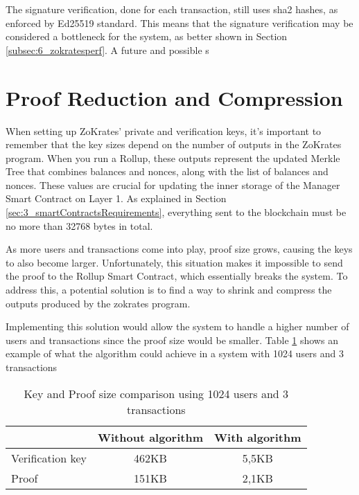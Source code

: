 The signature verification, done for each transaction, still uses sha2 hashes, as enforced by Ed25519 standard. This means that the signature verification may be considered a bottleneck for the system, as better shown in Section \ref{subsec:6_zokratesperf}. A future and possible s

\section{Proof Reduction and Compression \label{sec:5_redandcompr}}

When setting up ZoKrates' private and verification keys, it's important to remember that the key sizes depend on the number of outputs in the ZoKrates program. When you run a Rollup, these outputs represent the updated Merkle Tree that combines balances and nonces, along with the list of balances and nonces. These values are crucial for updating the inner storage of the Manager Smart Contract on Layer 1. As explained in Section \ref{sec:3_smartContractsRequirements}, everything sent to the blockchain must be no more than 32768 bytes in total.

As more users and transactions come into play, proof size grows, causing the keys to also become larger. Unfortunately, this situation makes it impossible to send the proof to the Rollup Smart Contract, which essentially breaks the system. To address this, a potential solution is to find a way to shrink and compress the outputs produced by the zokrates program.

Implementing this solution would allow the system to handle a higher number of users and transactions since the proof size would be smaller. Table \ref{tab:5_keyandproofsize} shows an example of what the algorithm could achieve in a system with 1024 users and 3 transactions

\begin{table}
	\centering
	\begin{tabular}{|l|c|c|}
		\hline
		                 & Without algorithm & With algorithm \\
		\hline
		Verification key & 462KB             & 5,5KB          \\
		\hline
		Proof            & 151KB             & 2,1KB          \\
		\hline
	\end{tabular}
	\caption[Key and Proof size]{Key and Proof size comparison using 1024 users and 3 transactions}
	\label{tab:5_keyandproofsize}
\end{table}

